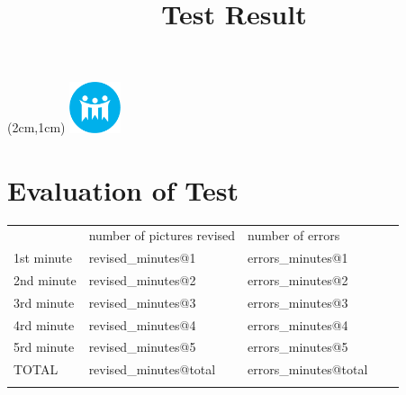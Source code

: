 \documentclass[12pt,a4paper]{article}
\begin{document}
\textblockorigin{-18pt}{-2pt}
\begin{textblock*}{10cm}(2cm,1cm)
\includegraphics[width=1.5cm]{CodeToGiveApp/latex/logo.png}
\end{textblock*}



\title{\vspace{-2.0cm}Test Result}
\maketitle 
\section*{Evaluation of Test}      

\begin{table}[]
\begin{tabular}{lllll}
\cline{1-3}
\multicolumn{1}{|l|}{} & \multicolumn{1}{l|}{number of pictures revised} & \multicolumn{1}{l|}{number of errors} &  &  \\ \cline{1-3}
\multicolumn{1}{|l|}{1st minute} & \multicolumn{1}{l|}{revised_minutes@1} & \multicolumn{1}{l|}{errors_minutes@1} &  &  \\ \cline{1-3}
\multicolumn{1}{|l|}{2nd minute} & \multicolumn{1}{l|}{revised_minutes@2} & \multicolumn{1}{l|}{errors_minutes@2} &  &  \\ \cline{1-3}
\multicolumn{1}{|l|}{3rd minute} & \multicolumn{1}{l|}{revised_minutes@3} & \multicolumn{1}{l|}{errors_minutes@3} &  &  \\ \cline{1-3}
\multicolumn{1}{|l|}{4rd minute} & \multicolumn{1}{l|}{revised_minutes@4} & \multicolumn{1}{l|}{errors_minutes@4} &  &  \\ \cline{1-3}
\multicolumn{1}{|l|}{5rd minute} & \multicolumn{1}{l|}{revised_minutes@5} & \multicolumn{1}{l|}{errors_minutes@5} &  &  \\ \cline{1-3}
\multicolumn{1}{|l|}{TOTAL} & \multicolumn{1}{l|}{revised_minutes@total} & \multicolumn{1}{l|}{errors_minutes@total} &  &  \\ \cline{1-3}
                       &                       &                       &  & 
\end{tabular}
\end{table}
\end{document}

